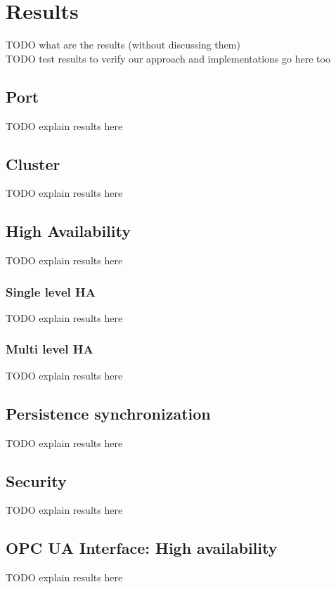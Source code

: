 \chapter{Results}\label{ch:res}
TODO what are the results (without discussing them)\\
TODO test results to verify our approach and implementations go here too\\

\section{Port}\label{sec:res:port}
TODO explain results here\\


\section{Cluster}\label{sec:res:cluster}
TODO explain results here\\


\section{High Availability}\label{sec:res:ha}
TODO explain results here\\

\subsection*{Single level HA}\label{sec:res:sl-ha}
TODO explain results here\\

\subsection*{Multi level HA}\label{sec:res:ml-ha}
TODO explain results here\\

\section{Persistence synchronization}\label{sec:res:psync}
TODO explain results here\\

\section{Security}\label{sec:res:security}
TODO explain results here\\

\section{OPC UA Interface: High availability}\label{sec:res:opc-ua}
TODO explain results here\\
